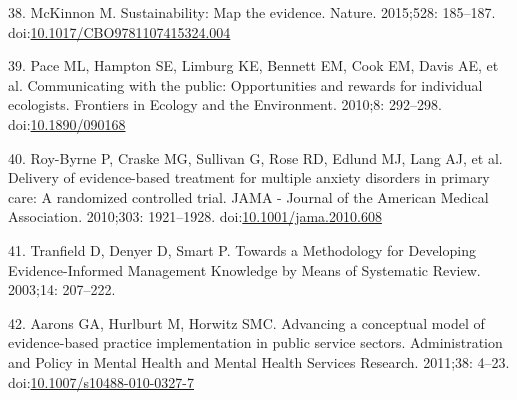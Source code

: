 \documentclass[10pt,letterpaper]{article}
\begin{document}
\hypertarget{ref-McKinnon2015}{}
38. McKinnon M. Sustainability: Map the evidence. Nature. 2015;528:
185--187.
doi:\href{https://doi.org/10.1017/CBO9781107415324.004}{10.1017/CBO9781107415324.004}

\hypertarget{ref-Pace2010}{}
39. Pace ML, Hampton SE, Limburg KE, Bennett EM, Cook EM, Davis AE, et
al. Communicating with the public: Opportunities and rewards for
individual ecologists. Frontiers in Ecology and the Environment. 2010;8:
292--298. doi:\href{https://doi.org/10.1890/090168}{10.1890/090168}

\hypertarget{ref-Roy-Byrne2010}{}
40. Roy-Byrne P, Craske MG, Sullivan G, Rose RD, Edlund MJ, Lang AJ, et
al. Delivery of evidence-based treatment for multiple anxiety disorders
in primary care: A randomized controlled trial. JAMA - Journal of the
American Medical Association. 2010;303: 1921--1928.
doi:\href{https://doi.org/10.1001/jama.2010.608}{10.1001/jama.2010.608}

\hypertarget{ref-Tranfield2003}{}
41. Tranfield D, Denyer D, Smart P. Towards a Methodology for Developing
Evidence-Informed Management Knowledge by Means of Systematic Review.
2003;14: 207--222.

\hypertarget{ref-Aarons2011}{}
42. Aarons GA, Hurlburt M, Horwitz SMC. Advancing a conceptual model of
evidence-based practice implementation in public service sectors.
Administration and Policy in Mental Health and Mental Health Services
Research. 2011;38: 4--23.
doi:\href{https://doi.org/10.1007/s10488-010-0327-7}{10.1007/s10488-010-0327-7}

\nolinenumbers
\end{document}
